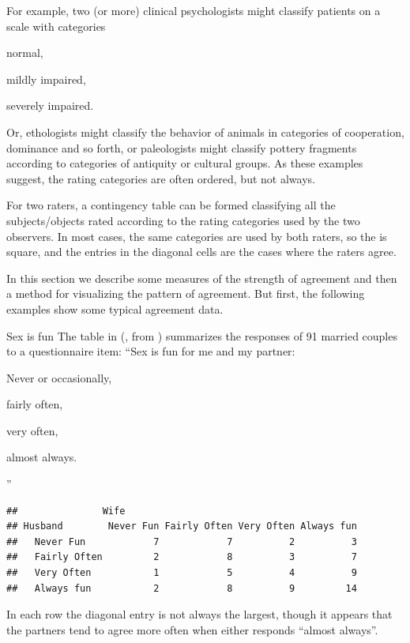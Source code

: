 \documentclass[11pt]{book}
\renewenvironment{knitrout}{\small\renewcommand{\baselinestretch}{.85}}{} %
\begin{document}
For example, two (or more) clinical psychologists might classify
patients on a scale with categories
\begin{seriate}
\item normal, 
\item mildly impaired,
\item severely impaired.
\end{seriate}
Or, ethologists might classify the behavior
of animals in categories of cooperation, dominance and so forth,
or paleologists might classify pottery fragments according to
categories of antiquity or cultural groups. As these examples
suggest, the rating categories are often ordered, but not always.

For two raters, a
contingency table can be
formed classifying all the subjects/objects rated
according to the rating categories used by the two
observers. 
In most cases, the same categories are used by both raters,
so the \ctab is square, and the entries in the diagonal cells
are the cases where the raters agree.

In this section we describe some measures of the strength
of agreement and then a method for visualizing the pattern of
agreement.  But first, the following examples show some
typical agreement data.

\begin{Example}[sexisfun1]{Sex is fun} 
The  table in 
(\citet[Table 2.10]{Agresti:90}, from \citet{Hout-etal:87})
 summarizes the responses of 91
married couples to a questionnaire item:
``Sex is fun for me and my partner: 
\begin{seriate}
  \item Never or occasionally, 
  \item fairly often, 
  \item very often, 
  \item almost always.
\end{seriate}
''
\begin{knitrout}
\color{fgcolor}\begin{kframe}
\begin{alltt}
\hlstd{(}\hlstd{,} \hlstd{=}\hlstd{)}
\end{alltt}
\begin{verbatim}
##               Wife
## Husband        Never Fun Fairly Often Very Often Always fun
##   Never Fun            7            7          2          3
##   Fairly Often         2            8          3          7
##   Very Often           1            5          4          9
##   Always fun           2            8          9         14
\end{verbatim}
\end{kframe}
\end{knitrout}

In each row the diagonal entry is not always the largest, though it
appears that the partners tend to agree more often when either responds
``almost always''.
%
\end{Example}
\end{document}
